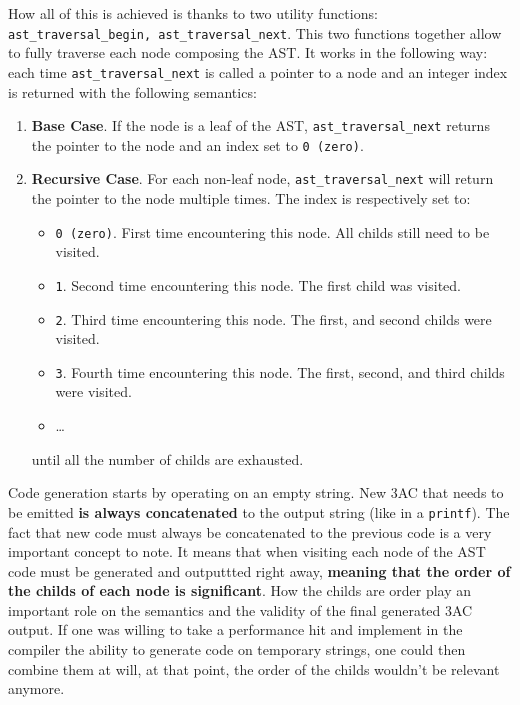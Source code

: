 \documentclass[a4paper]{article}
\begin{document}
How all of this is achieved is thanks to two utility functions: \texttt{ast\_traversal\_begin, ast\_traversal\_next}. This two functions together
allow to fully traverse each node composing the AST. It works in the following way: each time \texttt{ast\_traversal\_next} is called a pointer to a node
and an integer index is returned with the following semantics:
\begin{enumerate}
    \item \textbf{Base Case}. If the node is a leaf of the AST, \texttt{ast\_traversal\_next} returns the pointer to the node and an index set to \texttt{0 (zero)}.
    \item \textbf{Recursive Case}. For each non-leaf node, \texttt{ast\_traversal\_next} will return the pointer to the node multiple times. The index is respectively
        set to:
        \begin{itemize}
            \item \texttt{0 (zero)}. First time encountering this node. All childs still need to be visited.
            \item \texttt{1}. Second time encountering this node. The first child was visited.
            \item \texttt{2}. Third time encountering this node. The first, and second childs were visited.
            \item \texttt{3}. Fourth time encountering this node. The first, second, and third childs were visited.
            \item \dots
        \end{itemize}

        until all the number of childs are exhausted.

\end{enumerate}

Code generation starts by operating on an empty string. New 3AC that needs to be emitted \textbf{is always concatenated} to the output string (like in a \texttt{printf}).
The fact that new code must always be concatenated to the previous code is a very important concept to note. It means
that when visiting each node of the AST code must be generated and outputtted right away, \textbf{meaning that the order of the childs of each node is significant}.
How the childs are order play an important role on the semantics and the validity of the final generated 3AC output.
If one was willing to take a performance hit and implement in the compiler the ability to generate code on temporary strings, one could then combine them at will, at that point, the order of the childs wouldn't be relevant anymore.
\end{document}

